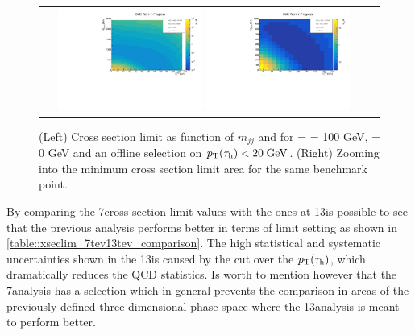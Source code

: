 \begin{figure}[tbh!]
	\centering
	\begin{tabular}{cc}
		\includegraphics[width=0.45\textwidth]{analysis/pics/JetInvMass_vs_MET_xsec_chi100_lsp000_taupt20.pdf}
		\includegraphics[width=0.45\textwidth]{analysis/pics/JetInvMass_vs_MET_xsec_chi100_lsp000_taupt20_zoom.pdf} 		
	\end{tabular}
	\caption{(Left) Cross section limit as function of $m_{jj}$ and \met for \charginopm = \neutralinotwo = 100 GeV, \neutralinoone = 0 GeV and an offline selection on $p_{\text{T}}(\tau_{\text{h}}) <  20\;\text{Ge}\kern-0.06667em\text{V}$. (Right) Zooming into the minimum cross section limit area for the same benchmark point.}
	\label{fig::xsec_lim_selected_results}
\end{figure}

By comparing the 7\tev cross-section limit values with the ones at 13\tev is possible to see that the previous analysis performs better in terms of limit setting as shown in \autoref{table::xseclim_7tev13tev_comparison}. The high statistical and systematic uncertainties shown in the 13\tev is caused by the cut over the $p_{\text{T}}(\tau_{\text{h}})$, which dramatically reduces the QCD statistics. Is worth to mention however that the 7\tev analysis has a selection which in general prevents the comparison in areas of the previously defined three-dimensional phase-space where the 13\tev analysis is meant to perform better.

